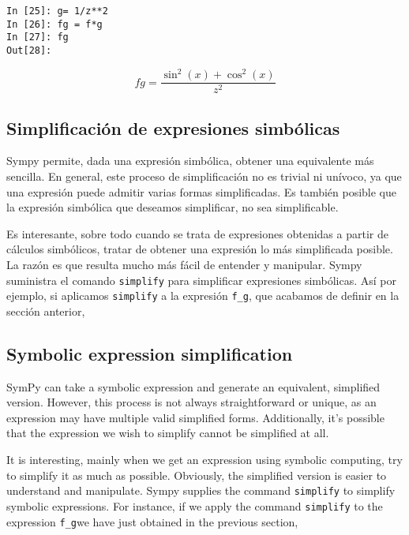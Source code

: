\begin{center}
	\begin{minipage}{.25\textwidth}
		\begin{verbatim}
In [25]: g= 1/z**2
In [26]: fg = f*g
In [27]: fg
Out[28]:
		\end{verbatim}
	\end{minipage}
	\begin{equation*}
		fg = \frac{\sin^2(x) + \cos^2(x)}{z^2}
	\end{equation*}
\end{center}
\begin{paracol}{2}
\subsection{Simplificación de expresiones simbólicas}
Sympy permite, dada una expresión simbólica, obtener una equivalente más sencilla. En general, este proceso de simplificación no es trivial ni unívoco, ya que una expresión puede admitir varias formas simplificadas. Es también posible que la expresión simbólica que deseamos simplificar, no sea simplificable.

Es interesante, sobre todo cuando se trata de expresiones obtenidas a partir de cálculos simbólicos, tratar de obtener una expresión lo más simplificada posible. La razón es que resulta mucho más fácil de entender y manipular. Sympy suministra el comando \texttt{simplify} para simplificar expresiones simbólicas. Así por ejemplo, si aplicamos \texttt{simplify} a la expresión \texttt{f\_g}, que acabamos de definir en la sección anterior, 
\switchcolumn
\subsection{Symbolic expression simplification}
SymPy can take a symbolic expression and generate an equivalent, simplified version. However, this process is not always straightforward or unique, as an expression may have multiple valid simplified forms. Additionally, it's possible that the expression we wish to simplify cannot be simplified at all.

It is interesting, mainly when we get an expression using symbolic computing, try to simplify it as much as possible. Obviously, the simplified version is easier to understand and manipulate. Sympy supplies the command \texttt{simplify} to simplify symbolic expressions. For instance, if we apply the command \texttt{simplify} to the expression \texttt{f\_g}we have just obtained in the previous section,
\end{paracol}
